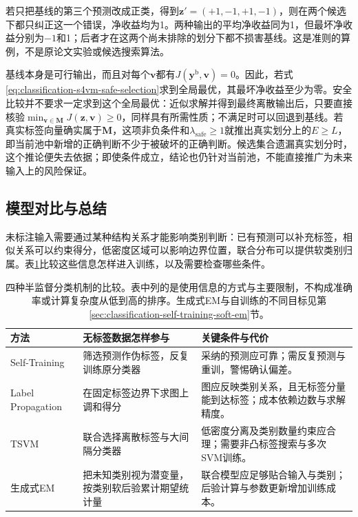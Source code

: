 若只把基线的第三个预测改成正类，得到$\bm z'=(+1,-1,+1,-1)$，则在两个候选下都只纠正这一个错误，净收益均为1。两种输出的平均净收益同为1，但最坏净收益分别为$-1$和1；后者才在这两个尚未排除的划分下都不损害基线。这是准则的算例，不是原论文实验或候选搜索算法。

基线本身是可行输出，而且对每个$\bm v$都有$J(\bm y^{\mathrm b},\bm v)=0$。因此，若式\eqref{eq:classification-s4vm-safe-selection}求到全局最优，其最坏净收益至少为零。安全比较并不要求一定求到这个全局最优：近似求解并得到最终离散输出后，只要直接核验$\min_{\bm v\in\bm M}J(\bm z,\bm v)\geq0$，同样具有所需性质；不满足时可以回退到基线。若真实标签向量确实属于$\bm M$，这项非负条件和$\lambda_{\mathrm{safe}}\geq1$就推出真实划分上的$E\geq L$，即当前池中新增的正确判断不少于被破坏的正确判断。候选集合遗漏真实划分时，这个推论便失去依据；即使条件成立，结论也仍针对当前池，不能直接推广为未来输入上的风险保证。

\subsection{模型对比与总结}
\label{sec:classification-semisupervised-comparison}

未标注输入需要通过某种结构关系才能影响类别判断：已有预测可以补充标签，相似关系可以约束得分，低密度区域可以影响边界位置，联合分布可以提供软类别归属。表\ref{tab:classification-semisupervised-comparison}比较这些信息怎样进入训练，以及需要检查哪些条件。

\begin{table}[htbp]
  \centering
  \small
  \begin{tabularx}{\linewidth}{@{}>{\RaggedRight\arraybackslash}p{25mm}>{\RaggedRight\arraybackslash}X>{\RaggedRight\arraybackslash}X@{}}
    \toprule
    方法 & 无标签数据怎样参与 & 关键条件与代价 \\
    \midrule
    Self-Training & 筛选预测作伪标签，反复训练原分类器 & 采纳的预测应可靠；需反复预测与重训，警惕确认偏差。 \\
    Label Propagation & 在固定标签边界下求图上调和得分 & 图应反映类别关系，且无标签分量能到达标签；成本依赖边数与求解精度。 \\
    TSVM & 联合选择离散标签与大间隔分类器 & 低密度分离及类别数量约束应合理；需要非凸标签搜索与多次SVM训练。 \\
    生成式EM & 把未知类别视为潜变量，按类别软后验累计期望统计量 & 联合模型应足够贴合输入与类别；后验计算与参数更新增加训练成本。 \\
    \bottomrule
  \end{tabularx}
  \caption{四种半监督分类机制的比较。表中列的是使用信息的方式与主要限制，不构成准确率或计算复杂度从低到高的排序。生成式EM与自训练的不同目标见第\ref{sec:classification-self-training-soft-em}节。}
  \label{tab:classification-semisupervised-comparison}
\end{table}

